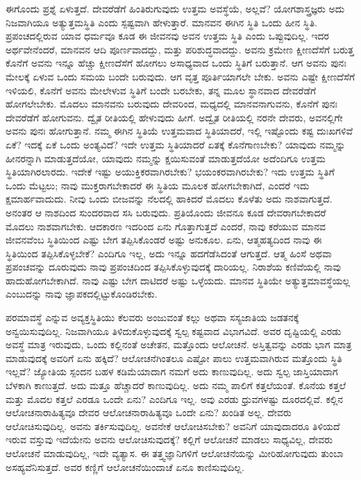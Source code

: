 ಈಗೊಂದು ಪ್ರಶ್ನೆ ಏಳುತ್ತದೆ. ದೇವರೆಡೆಗೆ ಹಿಂತಿರುಗುವುದು ಉತ್ತಮ ಅವಸ್ಥೆಯೆ, ಅಲ್ಲವೆ? ಯೋಗಶಾಸ್ತ್ರಜ್ಞರು ಅದು ನಿಜವಾಗಿಯೂ ಅತ್ಯುತ್ತಮಸ್ಥಿತಿ ಎಂದು ಸ್ಪಷ್ಟವಾಗಿ ಹೇಳುತ್ತಾರೆ. ಮಾನವನ ಈಗಿನ ಸ್ಥಿತಿ ಒಂದು ಹೀನ ಸ್ಥಿತಿ. ಪ್ರಪಂಚದಲ್ಲಿರುವ ಯಾವ ಧರ್ಮವೂ ಕೂಡ ಈ ಜೀವನವು ಅವನ ಉತ್ತಮ ಸ್ಥಿತಿ ಎಂದು ಒಪ್ಪುವುದಿಲ್ಲ. ಇದರ ಅರ್ಥವೇನೆಂದರೆ, ಮಾನವನ ಆದಿ ಪೂರ್ಣವಾದದ್ದು, ಮತ್ತು ಪರಿಶುದ್ಧವಾದದ್ದು. ಅವನು ಕ್ರಮೇಣ ಕ್ಷೀಣದೆಸೆಗೆ ಬರುತ್ತ ಕೊನೆಗೆ ಅವನು ಇನ್ನೂ ಹೆಚ್ಚು ಕ್ಷೀಣದೆಸೆಗೆ ಹೋಗಲು ಅಸಾಧ್ಯವಾದ ಒಂದು ಸ್ಥಿತಿಗೆ ಬರುತ್ತಾನೆ. ಆಗ ಅವನು ಪುನಃ ಮೇಲಕ್ಕೆ ಏಳುವ ಒಂದು ಸಮಯ ಬಂದೇ ಬರುವುದು. ಆಗ ವೃತ್ತ ಪೂರ್ತಿಯಾಗಲೇ ಬೇಕು. ಅವನು ಎಷ್ಟೇ ಕ್ಷೀಣದೆಸೆಗೆ ಇಳಿಯಲಿ, ಕೊನೆಗೆ ಅವನು ಮೇಲೇಳುವ ಸ್ಥಿತಿಗೆ ಬಂದೇ ಬರಬೇಕು, ತನ್ನ ಮೂಲ ಸ್ಥಾನವಾದ ದೇವರೆಡೆಗೆ ಹೋಗಲೇಬೇಕು. ಮೊದಲು ಮಾನವನು ಬರುವುದು ದೇವರಿಂದ, ಮಧ್ಯದಲ್ಲಿ ಮಾನವನಾಗುವನು, ಕೊನೆಗೆ ಪುನಃ ದೇವರೆಡೆಗೆ ಹೋಗುವನು. ದ್ವೈತ ರೀತಿಯಲ್ಲಿ ಹೇಳುವುದು ಹೀಗೆ. ಅದ್ವೈತ ರೀತಿಯಲ್ಲಿ ನರನೇ ದೇವರು, ಅವನಲ್ಲಿಗೇ ಅವನು ಪುನಃ ಹೋಗುತ್ತಾನೆ. ನಮ್ಮ ಈಗಿನ ಸ್ಥಿತಿಯೆ ಉತ್ತಮವಾದ ಸ್ಥಿತಿಯಾದರೆ, ಇಲ್ಲಿ ಇಷ್ಟೊಂದು ಕಷ್ಟ ದುಃಖಗಳಿವೆ ಏಕೆ? ಇದಕ್ಕೆ ಏಕೆ ಒಂದು ಅಂತ್ಯವಿದೆ? ಇದೇ ಉತ್ತಮ ಸ್ಥಿತಿಯಾದರೆ ಏತಕ್ಕೆ ಕೊನೆಗಾಣಬೇಕು? ಯಾವುದು ನಮ್ಮನ್ನು ಹೀನರನ್ನಾಗಿ ಮಾಡುತ್ತದೆಯೋ, ಯಾವುದು ನಮ್ಮನ್ನು ಕ್ಷಯಿಸುವಂತೆ ಮಾಡುತ್ತದೆಯೋ ಅದೆಂದಿಗೂ ಉತ್ತಮ ಸ್ಥಿತಿಯಾಗಿರಲಾರದು. ಇದೇಕೆ ಇಷ್ಟು ಅಯುಕ್ತಿಕರವಾಗಿರಬೇಕು? ಭಯಂಕರವಾಗಿರಬೇಕು? ಇದು ಉತ್ತಮ ಸ್ಥಿತಿಗೆ ಒಂದು ಮೆಟ್ಟಲು; ನಾವು ಮುಕ್ತರಾಗಬೇಕಾದರೆ ಈ ಸ್ಥಿತಿಯ ಮೂಲಕ ಹೋಗಬೇಕಾಗಿದೆ, ಎಂದರೆ ಇದು ಕ್ಷಮಾರ್ಹವಾದುದು. ನೀವು ಒಂದು ಬೀಜವನ್ನು ನೆಲದಲ್ಲಿ ಹಾಕಿದರೆ ಮೊದಲು ಕೊಳೆತು ಅದು ನಾಶವಾಗುತ್ತದೆ. ಅನಂತರ ಆ ನಾಶದಿಂದ ಸುಂದರವಾದ ಸಸಿ ಬರುವುದು. ಪ್ರತಿಯೊಂದು ಜೀವನೂ ಕೂಡ ದೇವರಾಗಬೇಕಾದರೆ ಮೊದಲು ನಾಶವಾಗಬೇಕು. ಆದಕಾರಣ ಇದರಿಂದ ಏನು ಗೊತ್ತಾಗುತ್ತದೆ ಎಂದರೆ, ನಾವು ಕರೆಯುವ ಮಾನವ ಜೀವನವೆಂಬ ಸ್ಥಿತಿಯಿಂದ ಎಷ್ಟು ಬೇಗ ತಪ್ಪಿಸಿಕೊಂಡರೆ ಅಷ್ಟು ಅನುಕೂಲ. ಏನು, ಆತ್ಮಹತ್ಯದಿಂದ ನಾವು ಈ ಸ್ಥಿತಿಯಿಂದ ತಪ್ಪಿಸಿಕೊಳ್ಳಬೇಕೆ? ಎಂದಿಗೂ ಇಲ್ಲ, ಅದು ಇನ್ನೂ ಹದಗೆಡೆಸಿದಂತೆ ಆಗುತ್ತದೆ. ಆತ್ಮ ಹಿಂಸೆ ಅಥವಾ ಪ್ರಪಂಚವನ್ನು ದೂರುವುದು ನಾವು ಪ್ರಪಂಚದಿಂದ ತಪ್ಪಿಸಿಕೊಳ್ಳುವುದಕ್ಕೆ ದಾರಿಯಲ್ಲ. ನಿರಾಶೆಯ ಕಣಿವೆಯಲ್ಲಿ ನಾವು ಹಾದುಹೋಗಬೇಕಾಗಿದೆ. ನಾವು ಎಷ್ಟು ಬೇಗ ದಾಟಿದರೆ ಅಷ್ಟು ಒಳ್ಳೆಯದು. ಮಾನವ ಸ್ಥಿತಿಯೇ ಅತ್ಯುತ್ತಮಾವಸ್ಥೆಯಲ್ಲ ಎಂಬುದನ್ನು ನಾವು ಜ್ಞಾಪಕದಲ್ಲಿಟ್ಟುಕೊಂಡಿರಬೇಕು. 

\vskip 5pt

ಪರಮಾವಸ್ಥೆ ಎನ್ನುವ ಅವ್ಯಕ್ತಸ್ಥಿತಿಯು ಕೆಲವರು ಅಂಜುವಂತೆ ಕಲ್ಲು ಅಥವಾ ಸಸ್ಯಜಾತಿಯ ಜಡತನಕ್ಕೆ ಅನ್ವಯಿಸುವುದಿಲ್ಲ. ನಿಜವಾಗಿಯೂ ತಿಳಿದುಕೊಳ್ಳುವುದಕ್ಕೆ ಸ್ವಲ್ಪ ಕಷ್ಟವಾದ ವಿಭಾಗವಿದೆ. ಅವರ ದೃಷ್ಟಿಯಲ್ಲಿ ಎರಡು ಅವಸ್ಥೆ ಮಾತ್ರ ಇರುವುದು, ಒಂದು ಕಲ್ಲಿನಂತೆ ಅಚೇತನ, ಮತ್ತೊಂದು ಆಲೋಚನೆ. ಅಸ್ತಿತ್ವವನ್ನು ಎರಡು ಭಾಗ ಮಾತ್ರ ಮಾಡುವುದಕ್ಕೆ ಅವರಿಗೆ ಏನು ಹಕ್ಕಿದೆ? ಆಲೋಚನೆಗಿಂತಲೂ ಎಷ್ಟೋ ಪಾಲು ಉತ್ತಮವಾಗಿರುವ ಮತ್ತೊಂದು ಸ್ಥಿತಿ ಇಲ್ಲವೆ? ಜ್ಯೋತಿಯ ಸ್ಪಂದನ ಬಹಳ ಕಡಿಮೆಯಾದಾಗ ನಮಗೆ ಅದು ಕಾಣುವುದಿಲ್ಲ. ಅದು ಸ್ವಲ್ಪ ಜಾಸ್ತಿಯಾದಾಗ ಬೆಳಕಾಗಿ ಕಾಣುತ್ತದೆ. ಅದು ಮತ್ತೂ ಹೆಚ್ಚಾದರೆ ಕಾಣುವುದಿಲ್ಲ. ಅದು ನಮ್ಮ ಪಾಲಿಗೆ ಕತ್ತಲೆಯಂತೆ. ಕೊನೆಯ ಕತ್ತಲೆ ಮತ್ತು ಮೊದಲ ಕತ್ತಲೆ ಎರಡೂ ಒಂದೇ ಏನು? ಎಂದಿಗೂ ಇಲ್ಲ. ಅವು ಎರಡು ಧ್ರುವಗಳಷ್ಟು ದೂರದಲ್ಲಿವೆ. ಕಲ್ಲಿನ ಆಲೋಚನಾರಾಹಿತ್ಯವೂ ದೇವರ ಆಲೋಚನಾರಾಹಿತ್ಯವೂ ಒಂದೇ ಏನು? ಖಂಡಿತ ಅಲ್ಲ. ದೇವರು ಆಲೋಚಿಸುವುದಿಲ್ಲ. ಅವನು ತರ್ಕಿಸುವುದಿಲ್ಲ. ಅವನೇಕೆ ಆಲೋಚಿಸಬೇಕು? ಅವನಿಗೆ ಯಾವುದಾದರೂ ತಿಳಿಯದೆ ಇರುವ ವಸ್ತುವು ಇದೆಯೇನು ಅವನು ಆಲೋಚಿಸುವುದಕ್ಕೆ? ಕಲ್ಲಿಗೆ ಆಲೋಚನೆ ಮಾಡಲು ಸಾಧ್ಯವಿಲ್ಲ, ದೇವರು ಆಲೋಚನೆ ಮಾಡುವುದಿಲ್ಲ, ಇದೇ ವ್ಯತ್ಯಾಸ. ಈ ತತ್ತ್ವಜ್ಞಾನಿಗಳಿಗೆ ಆಲೋಚನೆಯನ್ನು ಮೀರಿಹೋಗುವುದು ತುಂಬಾ ಅಸಹ್ಯವೆನಿಸುತ್ತದೆ. ಅವರ ಕಣ್ಣಿಗೆ ಆಲೋಚನೆಯಿಂದಾಚೆ ಏನೂ ಕಾಣಿಸುವುದಿಲ್ಲ. 

